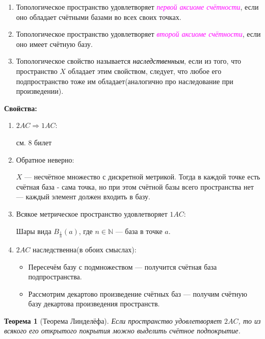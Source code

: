 \documentclass[a4paper,100pt]{article}
\theoremstyle{indented}
\newtheorem{theorem}{Теорема}
\begin{document}
    \begin{enumerate}
        \item Топологическое пространство удовлетворяет \textit{\textcolor{magenta}{первой аксиоме счётности}}, если оно обладает счётными базами во всех своих точках.
        \item Топологическое пространство удовлетворяет \textit{\textcolor{magenta}{второй аксиоме счётности}}, если оно имеет счётную базу.
        \item Топологическое свойство называется \textit{\textcolor{black}{наследственным}}, если из того, что пространство $X$ обладает этим свойством, следует, что любое его подпространство тоже им обладает(аналогично про наследование при произведении).
    \end{enumerate}
    \textbf{Свойства:} 
    \begin{enumerate}
        \item $2AC \Rightarrow 1AC$:
        
        см. 8 билет
        
        \item Обратное неверно:
        
        $X$ --- несчётное множество с дискретной метрикой. Тогда в каждой точке есть счётная база - сама точка, но при этом счётной базы всего пространства нет --- каждый элемент должен входить в базу.
        
        \item Всякое метрическое пространство удовлетворяет $1AC$:
        
        Шары вида $B_{\frac{1}{n}}(a)$, где $n \in \mathbb N$ --- база в точке $a$.
        
        \item $2AC$ наследственна(в обоих смыслах):
        \begin{itemize}
            \item Пересечём базу с подмножеством --- получится счётная база подпространства.
            \item Рассмотрим декартово произведение счётных баз --- получим счётную базу декартова произведения пространств. 
        \end{itemize}
    \end{enumerate}
    
    \begin{theorem}[Теорема Линделёфа]
        Если пространство удовлетворяет $2AC$, то из всякого его открытого покрытия можно выделить счётное подпокрытие.
    \end{theorem}
    
\end{document}
